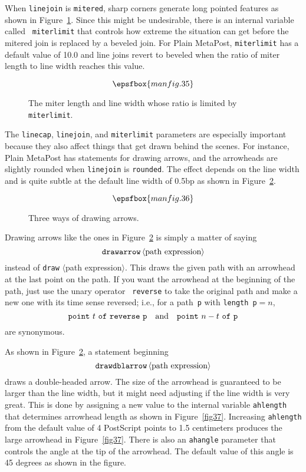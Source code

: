 \documentclass{article} %
\newcommand\descr[1]{{\langle\hbox{#1}\rangle}}
\newcommand\invisgap{\nobreak\hskip0pt\relax}
\newcommand\tdescr[1]{$\langle$\invisgap#1\invisgap$\rangle$}
\begin{document}
When {\tt linejoin} is {\tt mitered}, sharp corners generate long
pointed features as shown in Figure~\ref{fig35}.  Since this might be
undesirable, there is an internal variable called {\tt
miterlimit}\label{Dmiterlim} that
controls how extreme the situation can get before the mitered join is
replaced by a beveled join.  For Plain MetaPost, {\tt miterlimit} has a
default value of 10.0 and line joins revert to beveled when the ratio of
miter length to line width reaches this value.

\begin{figure}[htp]
$$ \epsfbox{manfig.35} $$
\caption{The miter length and line width whose ratio is limited by
        {\tt miterlimit}.}
\label{fig35}
\end{figure}

The {\tt linecap}, {\tt linejoin}, and {\tt miterlimit} parameters are
especially important because they also affect things that get drawn
behind the scenes.  For instance, Plain MetaPost has statements for
drawing arrows, and the arrowheads are slightly rounded
when {\tt linejoin} is {\tt rounded}.  The effect depends on the line
width and is quite subtle at the default line width of 0.5bp as shown in
Figure~\ref{fig36}.

\begin{figure}[htp]
$$\epsfbox{manfig.36}$$
\caption{Three ways of drawing arrows.}
\label{fig36}
\end{figure}

Drawing arrows like the ones in Figure~\ref{fig36} is simply a matter of
saying\label{Ddrwarr}
$$ {\tt drawarrow}\, \descr{path expression} $$
instead of {\tt draw} \tdescr{path expression}.  This draws the given
path with an arrowhead at the last point on the path.  If you want the
arrowhead at the beginning of the path, just use the unary operator {\tt
reverse}\label{Drevrse} to take the
original path and make a new one with its time sense reversed; i.e., for
a path~{\tt p} with {\tt length p}${}=n$,
$$ {\tt point\ } t {\tt\ of\ reverse\ p}
  \quad {\rm and} \quad
   {\tt point\ } n-t {\tt\ of\ p}
$$ are synonymous.

As shown in Figure~\ref{fig36}, a statement
beginning%
\label{Ddrwdar}
$$ {\tt drawdblarrow}\, \descr{path expression} $$
draws a double-headed arrow.  The size of the arrowhead is guaranteed to
be larger than the line width, but it might need adjusting if the line
width is very great.  This is done by assigning a new value to the
internal variable
{\tt ahlength}\label{Dahlength} that
determines arrowhead length as shown in Figure~\ref{fig37}.  Increasing
{\tt ahlength} from the default value of 4 PostScript points to 1.5
centimeters produces the large arrowhead in Figure~\ref{fig37}.  There
is also an {\tt ahangle}\label{Dahangle}
parameter that controls the angle at the tip of the arrowhead.  The
default value of this angle is 45 degrees as shown in the figure.
\end{document}
